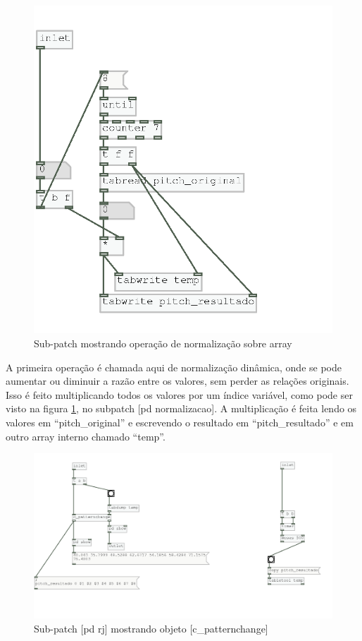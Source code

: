 \documentclass{ppgmus}
\begin{document}
\begin{figure}
\includegraphics[scale=.6]{variacao-normalizacao}
\caption{Sub-patch mostrando operação de normalização sobre array}
\label{variacoes-normalizacao}
\end{figure}  

A primeira operação é chamada aqui de normalização dinâmica, onde
se pode aumentar ou diminuir a razão entre os valores, sem perder
as relações originais. Isso é feito multiplicando todos os valores por
um índice variável, como pode ser visto na figura \ref{variacoes-normalizacao},
no subpatch [pd normalizacao]. A multiplicação é feita lendo
os valores em ``pitch\_original'' e escrevendo o resultado em ``pitch\_resultado'' e 
em outro array interno chamado ``temp''.



\begin{figure}
\includegraphics[scale=.6]{variacoes-interno}
\caption{Sub-patch [pd rj] mostrando objeto [c\_patternchange]}
\label{variacoes-interno}
\end{figure}  
\end{document}
